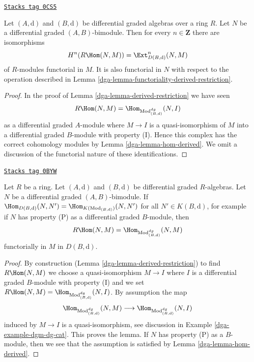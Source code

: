 \begin{lemma}
\label{dga-lemma-derived-restriction-exts}
\href{https://stacks.math.columbia.edu/tag/0CS5}{\texttt{Stacks tag 0CS5}}

Let $(A, \text{d})$ and $(B, \text{d})$ be differential graded algebras
over a ring $R$. Let $N$ be a differential graded $(A, B)$-bimodule.
Then for every $n \in \mathbf{Z}$ there are isomorphisms
$$
H^n(R\Hom(N, M)) = \Ext^n_{D(B, \text{d})}(N, M)
$$
of $R$-modules functorial in $M$. It is also functorial in $N$
with respect to the operation described in
Lemma \ref{dga-lemma-functoriality-derived-restriction}.
\end{lemma}

\begin{proof}

In the proof of Lemma \ref{dga-lemma-derived-restriction}
we have seen
$$
R\Hom(N, M) =
\Hom_{\text{Mod}^{dg}_{(B, \text{d})}}(N, I)
$$
as a differential graded $A$-module
where $M \to I$ is a quasi-isomorphism of $M$ into a differential
graded $B$-module with property (I). Hence this complex has the
correct cohomology modules by Lemma \ref{dga-lemma-hom-derived}.
We omit a discussion of the functorial nature of these
identifications.
\end{proof}

\begin{lemma}
\label{dga-lemma-compute-derived-restriction}
\href{https://stacks.math.columbia.edu/tag/0BYW}{\texttt{Stacks tag 0BYW}}

Let $R$ be a ring. Let $(A, \text{d})$ and $(B, \text{d})$ be
differential graded $R$-algebras. Let $N$ be a differential
graded $(A, B)$-bimodule. If
$\Hom_{D(B, \text{d})}(N, N') = \Hom_{K(\text{Mod}_{(B, \text{d})})}(N, N')$
for all $N' \in K(B, \text{d})$, for example if $N$
has property (P) as a differential graded $B$-module, then
$$
R\Hom(N, M) = \Hom_{\text{Mod}^{dg}_{(B, \text{d})}}(N, M)
$$
functorially in $M$ in $D(B, \text{d})$.
\end{lemma}

\begin{proof}

By construction (Lemma \ref{dga-lemma-derived-restriction})
to find $R\Hom(N, M)$ we choose a quasi-isomorphism
$M \to I$ where $I$ is a differential graded $B$-module
with property (I) and we set
$R\Hom(N, M) = \Hom_{\text{Mod}^{dg}_{(B, \text{d})}}(N, I)$.
By assumption the map
$$
\Hom_{\text{Mod}^{dg}_{(B, \text{d})}}(N, M) \longrightarrow
\Hom_{\text{Mod}^{dg}_{(B, \text{d})}}(N, I)
$$
induced by $M \to I$ is a quasi-isomorphism, see discussion in
Example \ref{dga-example-dgm-dg-cat}. This proves the lemma.
If $N$ has property (P) as a $B$-module, then we see that the
assumption is satisfied by Lemma \ref{dga-lemma-hom-derived}.
\end{proof}

